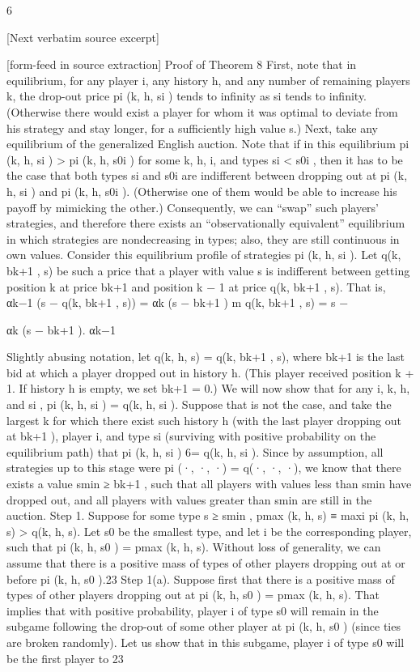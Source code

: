 \documentclass[10pt]{article}
\begin{document}
\begin{ReviewVerbatim}
6

[Next verbatim source excerpt]



[form-feed in source extraction]
Proof of Theorem 8
First, note that in equilibrium, for any player i, any history h, and any number of remaining players
k, the drop-out price pi (k, h, si ) tends to infinity as si tends to infinity. (Otherwise there would
exist a player for whom it was optimal to deviate from his strategy and stay longer, for a sufficiently
high value s.) Next, take any equilibrium of the generalized English auction. Note that if in this
equilibrium pi (k, h, si ) > pi (k, h, s0i ) for some k, h, i, and types si < s0i , then it has to be the
case that both types si and s0i are indifferent between dropping out at pi (k, h, si ) and pi (k, h, s0i ).
(Otherwise one of them would be able to increase his payoff by mimicking the other.) Consequently,
we can “swap” such players’ strategies, and therefore there exists an “observationally equivalent”
equilibrium in which strategies are nondecreasing in types; also, they are still continuous in own
values. Consider this equilibrium profile of strategies pi (k, h, si ).
Let q(k, bk+1 , s) be such a price that a player with value s is indifferent between getting position
k at price bk+1 and position k − 1 at price q(k, bk+1 , s). That is,
αk−1 (s − q(k, bk+1 , s)) = αk (s − bk+1 )
m
q(k, bk+1 , s) = s −

αk
(s − bk+1 ).
αk−1

Slightly abusing notation, let q(k, h, s) = q(k, bk+1 , s), where bk+1 is the last bid at which a player
dropped out in history h. (This player received position k + 1. If history h is empty, we set
bk+1 = 0.) We will now show that for any i, k, h, and si , pi (k, h, si ) = q(k, h, si ).
Suppose that is not the case, and take the largest k for which there exist such history h (with
the last player dropping out at bk+1 ), player i, and type si (surviving with positive probability on
the equilibrium path) that pi (k, h, si ) 6= q(k, h, si ). Since by assumption, all strategies up to this
stage were pi (·, ·, ·) = q(·, ·, ·), we know that there exists a value smin ≥ bk+1 , such that all players
with values less than smin have dropped out, and all players with values greater than smin are still
in the auction.
Step 1. Suppose for some type s ≥ smin , pmax (k, h, s) ≡ maxi pi (k, h, s) > q(k, h, s). Let s0
be the smallest type, and let i be the corresponding player, such that pi (k, h, s0 ) = pmax (k, h, s).
Without loss of generality, we can assume that there is a positive mass of types of other players
dropping out at or before pi (k, h, s0 ).23
Step 1(a). Suppose first that there is a positive mass of types of other players dropping out
at pi (k, h, s0 ) = pmax (k, h, s). That implies that with positive probability, player i of type s0 will
remain in the subgame following the drop-out of some other player at pi (k, h, s0 ) (since ties are
broken randomly). Let us show that in this subgame, player i of type s0 will be the first player to
23


\end{ReviewVerbatim}
\end{document}
